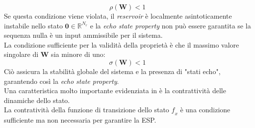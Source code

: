 \begin{equation}\label{raggiospettrale}
\rho(\mathbf{W})<1
\end{equation}
Se questa condizione viene violata, il \textit{reservoir} è localmente asintoticamente instabile nello stato $\mathbf{0} \in \mathbb{R}^{N_r}$ e la \textit{echo state property} non può essere garantita se la sequenza nulla è un input ammissibile per il sistema.\\
La condizione sufficiente per la validità della proprietà è che il massimo valore singolare di \textbf{W} sia minore di uno:
\begin{equation}\label{raggiospettrale2}
\sigma(\mathbf{W}) <1
\end{equation}
Ciò assicura la stabilità globale del sistema e la presenza di "stati echo", garantendo così la \textit{echo state property}.\\
Una caratteristica molto importante evidenziata in \cite{Markovianfactor:paper}  è la contrattività delle dinamiche dello stato.\\
La contratività della funzione di transizione dello stato $\mathit{f_x}$ è una condizione sufficiente ma non necessaria per garantire la ESP.
